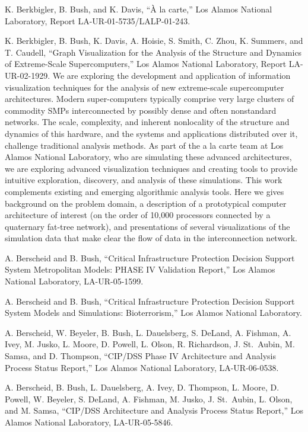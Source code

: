 \documentclass[]{article}
\begin{document}
K. Berkbigler, B. Bush, and K. Davis, ``À la carte,'' Los Alamos
National Laboratory, Report LA-UR-01-5735/LALP-01-243.

K. Berkbigler, B. Bush, K. Davis, A. Hoisie, S. Smith, C. Zhou, K.
Summers, and T. Caudell, ``Graph Visualization for the Analysis of the
Structure and Dynamics of Extreme-Scale Supercomputers,'' Los Alamos
National Laboratory, Report LA-UR-02-1929. We are exploring the
development and application of information visualization techniques for
the analysis of new extreme-scale supercomputer architectures. Modern
super-computers typically comprise very large clusters of commodity SMPs
interconnected by possibly dense and often nonstandard networks. The
scale, complexity, and inherent nonlocality of the structure and
dynamics of this hardware, and the systems and applications distributed
over it, challenge traditional analysis methods. As part of the a la
carte team at Los Alamos National Laboratory, who are simulating these
advanced architectures, we are exploring advanced visualization
techniques and creating tools to provide intuitive exploration,
discovery, and analysis of these simulations. This work complements
existing and emerging algorithmic analysis tools. Here we gives
background on the problem domain, a description of a prototypical
computer architecture of interest (on the order of 10,000 processors
connected by a quaternary fat-tree network), and presentations of
several visualizations of the simulation data that make clear the flow
of data in the interconnection network.

A. Berscheid and B. Bush, ``Critical Infrastructure Protection Decision
Support System Metropolitan Models: PHASE IV Validation Report,'' Los
Alamos National Laboratory, LA-UR-05-1599.

A. Berscheid and B. Bush, ``Critical Infrastructure Protection Decision
Support System Models and Simulations: Bioterrorism,'' Los Alamos
National Laboratory.

A. Berscheid, W. Beyeler, B. Bush, L. Dauelsberg, S. DeLand, A. Fishman,
A. Ivey, M. Jusko, L. Moore, D. Powell, L. Olson, R. Richardson, J.
St.~Aubin, M. Samsa, and D. Thompson, ``CIP/DSS Phase IV Architecture
and Analysis Process Status Report,'' Los Alamos National Laboratory,
LA-UR-06-0538.

A. Berscheid, B. Bush, L. Dauelsberg, A. Ivey, D. Thompson, L. Moore, D.
Powell, W. Beyeler, S. DeLand, A. Fishman, M. Jusko, J. St.~Aubin, L.
Olson, and M. Samsa, ``CIP/DSS Architecture and Analysis Process Status
Report,'' Los Alamos National Laboratory, LA-UR-05-5846.
\end{document}
